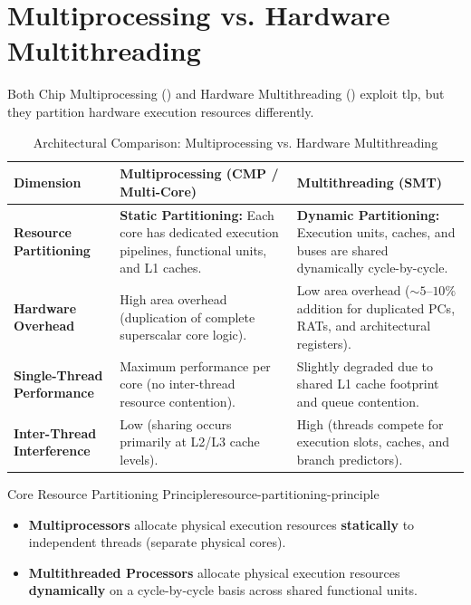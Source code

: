 \section{Multiprocessing vs. Hardware Multithreading}
\label{sec:multiprocessing_vs_multithreading}

Both Chip Multiprocessing () and Hardware Multithreading () exploit \gls{tlp}, but they partition hardware execution resources differently.

\begin{table}[htbp]
\centering
\caption{Architectural Comparison: Multiprocessing vs. Hardware Multithreading}
\label{tab:cmp_vs_smt}
\small
\setlength{\tabcolsep}{6pt}
\begin{tabularx}{\textwidth}{|>{\hsize=0.8\hsize\raggedright\arraybackslash}X|>{\hsize=1.1\hsize\raggedright\arraybackslash}X|>{\hsize=1.1\hsize\raggedright\arraybackslash}X|}
\hline
\textbf{Dimension} & \textbf{Multiprocessing (CMP / Multi-Core)} & \textbf{Multithreading (SMT)} \\ \hline
\textbf{Resource Partitioning} & \textbf{Static Partitioning:} Each core has dedicated execution pipelines, functional units, and L1 caches. & \textbf{Dynamic Partitioning:} Execution units, caches, and buses are shared dynamically cycle-by-cycle. \\ \hline
\textbf{Hardware Overhead} & High area overhead (duplication of complete superscalar core logic). & Low area overhead ($\sim 5\text{--}10\%$ addition for duplicated PCs, RATs, and architectural registers). \\ \hline
\textbf{Single-Thread Performance} & Maximum performance per core (no inter-thread resource contention). & Slightly degraded due to shared L1 cache footprint and queue contention. \\ \hline
\textbf{Inter-Thread Interference} & Low (sharing occurs primarily at L2/L3 cache levels). & High (threads compete for execution slots, caches, and branch predictors). \\ \hline
\end{tabularx}
\end{table}

\begin{concept}{Core Resource Partitioning Principle}{resource-partitioning-principle}
    \begin{itemize}
        \item \textbf{Multiprocessors} allocate physical execution resources \textbf{statically} to independent threads (separate physical cores).
        \item \textbf{Multithreaded Processors} allocate physical execution resources \textbf{dynamically} on a cycle-by-cycle basis across shared functional units.
    \end{itemize}
\end{concept}

